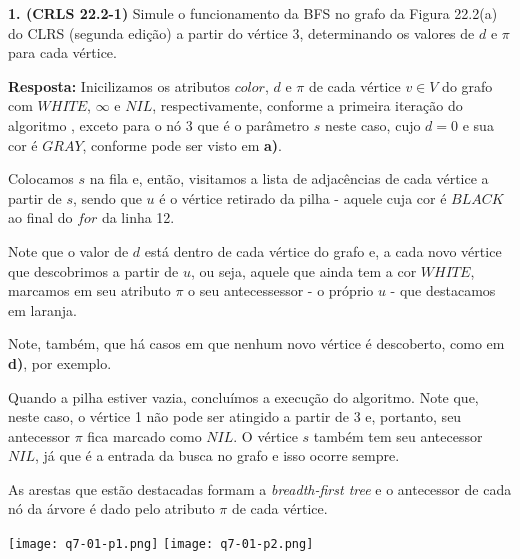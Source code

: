 
\noindent \textbf{1. (CRLS 22.2-1)} Simule o funcionamento da BFS no grafo da Figura 22.2(a) do CLRS (segunda edição) a partir do vértice 3, determinando os valores de $d$ e $\pi$ para cada vértice.

\textbf{Resposta:} Inicilizamos os atributos $color$, $d$ e $\pi$ de cada vértice $v \in V$ do grafo com $WHITE$, $\infty$ e $NIL$, respectivamente, conforme a primeira iteração do algoritmo , exceto para o nó 3 que é o parâmetro $s$ neste caso, cujo $d = 0$ e sua cor é $GRAY$, conforme pode ser visto em \textbf{a)}.

Colocamos $s$ na fila e, então, visitamos a lista de adjacências de cada vértice a partir de $s$, sendo que $u$ é o vértice retirado da pilha - aquele cuja cor é $BLACK$ ao final do $for$ da linha 12.

Note que o valor de $d$ está dentro de cada vértice do grafo e, a cada novo vértice que descobrimos a partir de $u$, ou seja, aquele que ainda tem a cor $WHITE$, marcamos em seu atributo $\pi$ o seu antecessessor - o próprio $u$ - que destacamos em laranja.

Note, também, que há casos em que nenhum novo vértice é descoberto, como em \textbf{d)}, por exemplo.

Quando a pilha estiver vazia, concluímos a execução do algoritmo. Note que, neste caso, o vértice 1 não pode ser atingido a partir de 3 e, portanto, seu antecessor $\pi$ fica marcado como $NIL$. O vértice $s$ também tem seu antecessor $NIL$, já que é a entrada da busca no grafo e isso ocorre sempre.

As arestas que estão destacadas formam a \textit{breadth-first tree} e o antecessor de cada nó da árvore é dado pelo atributo $\pi$ de cada vértice.

\begin{center}
\texttt{[image: q7-01-p1.png]}
\texttt{[image: q7-01-p2.png]}
\label{fig:7.1-1}
\end{center}